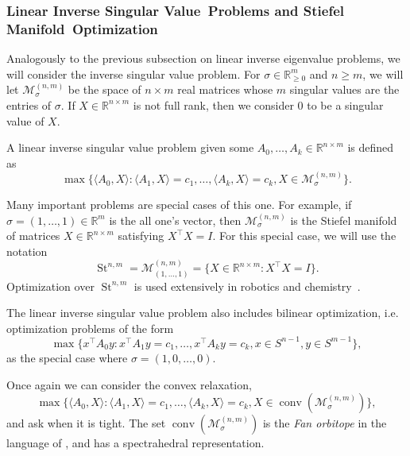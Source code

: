 \documentclass{article}
\numberwithin{equation}{section}
\newcommand{\R}{\mathbb{R}}
\DeclareMathOperator*{\conv}{conv}
\newcommand{\cM}{{\mathcal{M}}}
\newcommand{\Msing}{\cM^{(n,m)}_{\sigma}}
\DeclareMathOperator{\St}{St}
\begin{document}
\subsubsection{Linear Inverse Singular Value~Problems and Stiefel Manifold~Optimization}\label{subsubsec:lisv}
Analogously to the previous subsection on linear inverse eigenvalue problems, we will consider the inverse singular value problem. For $\sigma \in \R^{m}_{\ge 0}$ and $n \ge m$, we will let $\Msing$ be the space of $n\times m$ real matrices whose $m$ singular values are the entries of $\sigma$. If $X \in \R^{n\times m}$ is not full rank, then we consider 0 to be a singular value of $X$.

A linear inverse singular value problem given some 
$A_0, \dots, A_k \in \R^{n \times m}$ is defined as
\begin{equation}
    \max \{\langle A_0, X\rangle : \langle A_1, X\rangle = c_1, \dots, \langle A_k, X\rangle = c_k, X \in \Msing\}.
    \label{eq:inverse_singvalue}\tag{opt-LISV}
\end{equation}

Many important problems are special cases of this one.
For example, if $\sigma = (1,\dots, 1) \in \R^m$ is the all one's vector, then $\Msing$ is the Stiefel manifold of matrices $X \in \R^{n\times m}$ satisfying $X^{\intercal}X = I$. 
For this special case, we will use the notation
\[\St^{n,m} = \cM_{(1,\dots,1)}^{(n,m)} = \{X \in \R^{n\times m} : X^{\intercal}X = I\}.\]
Optimization over $\St^{n,m}$ is used extensively in robotics \cite{peretroukhin2020smooth,dellaert2020shonan, rosen2019se} and chemistry~\cite{bendory2020single}.

The linear inverse singular value problem also includes bilinear optimization, i.e. optimization problems of the form
\begin{equation}
    \max \{x^{\intercal} A_0 y : x^{\intercal} A_1 y = c_1, \dots, x^{\intercal} A_k y = c_k, x \in S^{n-1}, y \in S^{m-1}\},
\end{equation}
as the special case where $\sigma = (1,0,\dots,0)$.

Once again we can consider the convex relaxation,
\begin{equation}
    \max \{\langle A_0, X\rangle : \langle A_1, X\rangle = c_1, \dots, \langle A_k, X\rangle = c_k, X \in \conv(\Msing)\},
    \label{eq:inverse_singvalue_conv}\tag{cr-LISV}
\end{equation}
and ask when it is tight. The set $\conv(\Msing)$ is the \emph{Fan orbitope} in the language of \cite[Section 4.3]{sanyal2011orbitopes}, and has a spectrahedral representation.
\end{document}
